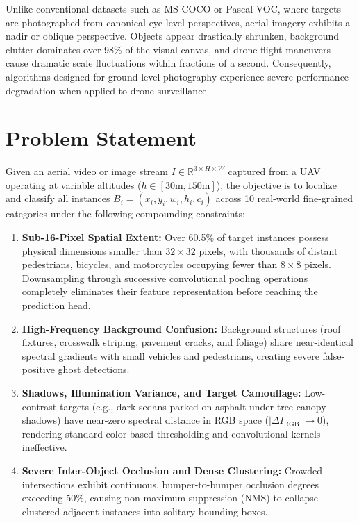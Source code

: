 \documentclass[12pt,a4paper]{report}
\begin{document}
Unlike conventional datasets such as MS-COCO or Pascal VOC, where targets are photographed from canonical eye-level perspectives, aerial imagery exhibits a nadir or oblique perspective. Objects appear drastically shrunken, background clutter dominates over 98\% of the visual canvas, and drone flight maneuvers cause dramatic scale fluctuations within fractions of a second. Consequently, algorithms designed for ground-level photography experience severe performance degradation when applied to drone surveillance.

\section{Problem Statement}
Given an aerial video or image stream $I \in \mathbb{R}^{3 \times H \times W}$ captured from a UAV operating at variable altitudes ($h \in [30\text{m}, 150\text{m}]$), the objective is to localize and classify all instances $B_i = (x_i, y_i, w_i, h_i, c_i)$ across 10 real-world fine-grained categories under the following compounding constraints:
\begin{enumerate}[leftmargin=2em]
    \item \textbf{Sub-16-Pixel Spatial Extent:} Over 60.5\% of target instances possess physical dimensions smaller than $32 \times 32$ pixels, with thousands of distant pedestrians, bicycles, and motorcycles occupying fewer than $8 \times 8$ pixels. Downsampling through successive convolutional pooling operations completely eliminates their feature representation before reaching the prediction head.
    \item \textbf{High-Frequency Background Confusion:} Background structures (roof fixtures, crosswalk striping, pavement cracks, and foliage) share near-identical spectral gradients with small vehicles and pedestrians, creating severe false-positive ghost detections.
    \item \textbf{Shadows, Illumination Variance, and Target Camouflage:} Low-contrast targets (e.g., dark sedans parked on asphalt under tree canopy shadows) have near-zero spectral distance in RGB space ($|\Delta I_{\text{RGB}}| \to 0$), rendering standard color-based thresholding and convolutional kernels ineffective.
    \item \textbf{Severe Inter-Object Occlusion and Dense Clustering:} Crowded intersections exhibit continuous, bumper-to-bumper occlusion degrees exceeding 50\%, causing non-maximum suppression (NMS) to collapse clustered adjacent instances into solitary bounding boxes.
\end{enumerate}
\end{document}
